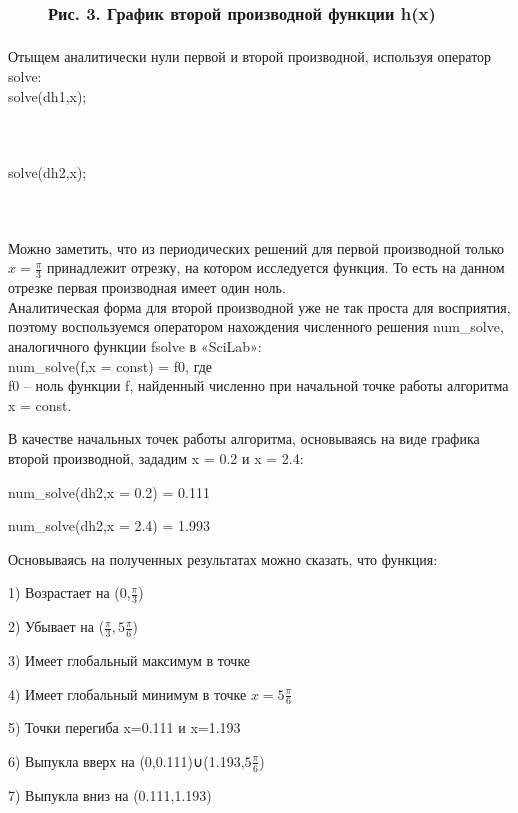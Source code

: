 ﻿ \documentclass[russian,utf8,nocolumnxxxi,nocolumnxxxii]{eskdtext}
\begin{document}
\begin{figure}[H]
\begin{center}
\begin{minipage}[h]{0.70\linewidth}
  \\
\frametitle{Рис. 3. График второй производной функции h(x)}
\frametitle{}
\end{minipage}
\end{center}
\end{figure}
Отыщем аналитически нули первой и второй производной, используя оператор solve:\\
solve(dh1,x);
\newpage
\begin{figure}[H]
\begin{center}
\begin{minipage}[h]{0.70\linewidth}
  \\
\frametitle{}
\frametitle{}
\end{minipage}
\end{center}
\end{figure}
solve(dh2,x);

\begin{figure}[H]
\begin{center}
\begin{minipage}[h]{0.70\linewidth}
  \\
\frametitle{}
\frametitle{}
\end{minipage}
\end{center}
\end{figure}

Можно заметить, что из периодических решений для первой производной только $x=\frac{\pi}{3}$ принадлежит отрезку, на котором исследуется функция. То есть на данном отрезке первая производная имеет один ноль.\\
Аналитическая форма для второй производной уже не так проста для восприятия, поэтому воспользуемся оператором нахождения численного решения num\_solve, аналогичного функции fsolve в «SciLab»:\\
num\_solve(f,x = const) = f0, где\\

f0 – ноль функции f, найденный численно при начальной точке работы алгоритма x = const.

В качестве начальных точек работы алгоритма, основываясь на виде графика второй производной, зададим x = 0.2 и x = 2.4:

num\_solve(dh2,x = 0.2) = 0.111

num\_solve(dh2,x = 2.4) = 1.993

Основываясь на полученных результатах можно сказать, что функция:

1) Возрастает на (0,$\frac{\pi}{3}$)

2) Убывает на ($\frac{\pi}{3},5\frac{\pi}{6}$)

3) Имеет глобальный максимум в точке

4) Имеет глобальный минимум в точке $x=5\frac{\pi}{6}$

5) Точки перегиба x=0.111 и x=1.193

6) Выпукла вверх на (0,0.111)∪(1.193,$5\frac{\pi}{6}$)

7) Выпукла вниз на (0.111,1.193)
\end{document}
